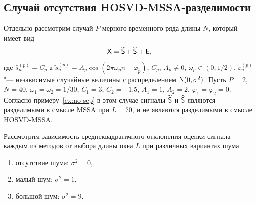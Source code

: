 \documentclass[specialist,
    substylefile = spbu.rtx,
    subf,href,colorlinks=true, 12pt]{disser}
\theoremstyle{plain}
\theoremstyle{definition}
\theoremstyle{remark}
\begin{document}
    \subsection{Случай отсутствия HOSVD-MSSA-разделимости}
    Отдельно рассмотрим случай $P$-мерного временного ряда длины $N$, который имеет вид
    \[
        \mathsf{X} = \widetilde{\mathsf{S}} + \widehat{\mathsf{S}} + \mathsf{E},
    \]
    где $\hat{s}_n^{(p)} = C_p$ а
    $\tilde{s}_n^{(p)} = A_p \cos(2\pi \omega_p n + \varphi_p)$,
    $C_p$, $A_p \ne 0$, $\omega_p \in (0, 1/2)$, $\varepsilon_n^{(p)}$ "--- независимые случайные величины
    с распределением $\mathrm{N}(0, \sigma^2)$.
    Пусть $P=2$, $N=40$, $\omega_1=\omega_2=1/30$, $C_1 = 3$, $C_2=-1.5$, $A_1 = 1$, $A_2 = 2$, 
    $\varphi_1 = \varphi_2 = 0$.
    Согласно примеру~\ref{ex:no-sep} в этом случае сигналы $\widetilde{\mathsf{S}}$ и $\widehat{\mathsf{S}}$ являются
    разделимыми в смысле MSSA при $L=30$, и не являются разделимыми в смысле HOSVD-MSSA.
    
    Рассмотрим зависимость среднеквадратичного отклонения оценки сигнала каждым из методов от выбора длины окна 
    $L$ при различных вариантах шума
    \begin{enumerate}
        \item отсутствие шума: $\sigma^2 = 0$,
        \item малый шум: $\sigma^2 = 1$,
        \item большой шум: $\sigma^2 = 9$.
    \end{enumerate}
    
\end{document}
